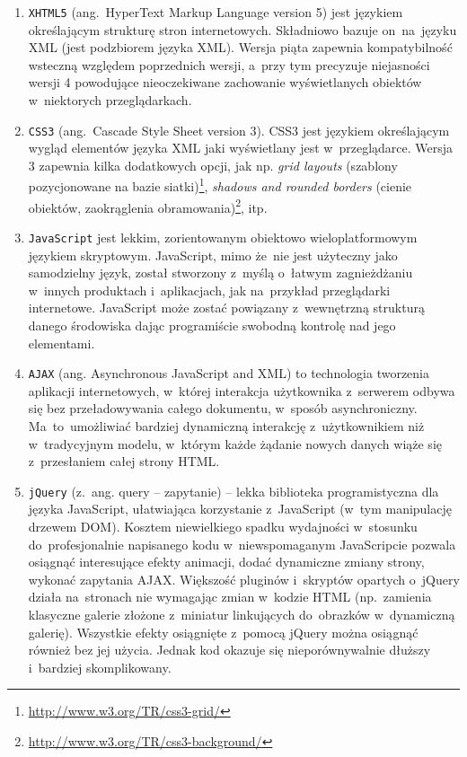 \begin{enumerate}
  \item \texttt{XHTML5}\cite{html5doc} (ang.~HyperText Markup Language version 5) jest językiem określającym strukturę stron internetowych. Składniowo bazuje on~na~języku XML (jest podzbiorem języka XML). Wersja piąta zapewnia kompatybilność wsteczną względem poprzednich wersji, a~przy tym precyzuje niejasności wersji 4 powodujące nieoczekiwane zachowanie wyświetlanych obiektów w~niektorych przeglądarkach.
  \item \texttt{CSS3}\cite{css3doc} (ang.~Cascade Style Sheet version 3). CSS3 jest językiem określającym wygląd elementów języka XML jaki wyświetlany jest w~przeglądarce. Wersja 3 zapewnia kilka dodatkowych opcji, jak np. \textit{grid layouts} (szablony pozycjonowane na bazie siatki)\footnote{\url{http://www.w3.org/TR/css3-grid/}}, \textit{shadows and rounded borders} (cienie obiektów, zaokrąglenia obramowania)\footnote{\url{http://www.w3.org/TR/css3-background/}}, itp.
  \item \texttt{JavaScript} jest lekkim, zorientowanym obiektowo wieloplatformowym językiem skryptowym. JavaScript, mimo że~nie jest użyteczny jako samodzielny język, został stworzony z~myślą o~łatwym zagnieżdżaniu w~innych produktach i~aplikacjach, jak na~przykład przeglądarki internetowe. JavaScript może zostać powiązany z~wewnętrzną strukturą danego środowiska dając programiście swobodną kontrolę nad jego elementami.
  \item \texttt{AJAX} (ang. Asynchronous JavaScript and XML) to technologia tworzenia aplikacji internetowych, w~której interakcja użytkownika z~serwerem odbywa się bez przeładowywania całego dokumentu, w~sposób asynchroniczny. Ma~to~umożliwiać bardziej dynamiczną interakcję z~użytkownikiem niż w~tradycyjnym modelu, w~którym każde żądanie nowych danych wiąże się z~przesłaniem całej strony HTML.
  \item \texttt{jQuery}\cite{jquery} (z.~ang. query -- zapytanie) -- lekka biblioteka programistyczna dla języka JavaScript, ułatwiająca korzystanie z~JavaScript (w~tym manipulację drzewem DOM). Kosztem niewielkiego spadku wydajności w~stosunku do~profesjonalnie napisanego kodu w~niewspomaganym JavaScripcie pozwala osiągnąć interesujące efekty animacji, dodać dynamiczne zmiany strony, wykonać zapytania AJAX. Większość pluginów i~skryptów opartych o~jQuery działa na~stronach nie wymagając zmian w~kodzie HTML (np.~zamienia klasyczne galerie złożone z~miniatur linkujących do~obrazków w~dynamiczną galerię). Wszystkie efekty osiągnięte z~pomocą jQuery można osiągnąć również bez jej użycia. Jednak kod okazuje się nieporównywalnie dłuższy i~bardziej skomplikowany.
\end{enumerate}
